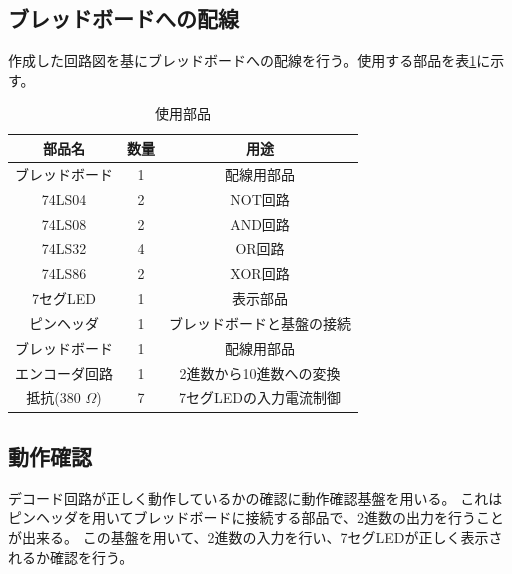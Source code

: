 \documentclass[a4paper,11pt,dvipdfmx]{jsarticle}
\begin{document}
\subsection{ブレッドボードへの配線}
作成した回路図を基にブレッドボードへの配線を行う。使用する部品を表\ref{tab:parts}に示す。
\begin{table}[htbp]
  \centering
  \caption{使用部品}
  \begin{tabular}{|c|c|c|}
    \hline
    部品名 & 数量 & 用途 \\
    \hline
    ブレッドボード & 1 & 配線用部品 \\
    74LS04 & 2 & NOT回路 \\
    74LS08 & 2 & AND回路 \\
    74LS32 & 4 & OR回路 \\
    74LS86 & 2 & XOR回路 \\
    7セグLED & 1 & 表示部品 \\
    ピンヘッダ & 1 & ブレッドボードと基盤の接続 \\
    ブレッドボード & 1 & 配線用部品 \\
    エンコーダ回路 & 1 & 2進数から10進数への変換 \\
    抵抗(380 $\Omega$) & 7 & 7セグLEDの入力電流制御 \\
    \hline
  \end{tabular}
  \label{tab:parts}
\end{table}
\subsection{動作確認}
デコード回路が正しく動作しているかの確認に動作確認基盤を用いる。
これはピンヘッダを用いてブレッドボードに接続する部品で、2進数の出力を行うことが出来る。
この基盤を用いて、2進数の入力を行い、7セグLEDが正しく表示されるか確認を行う。
\newpage
\end{document}
